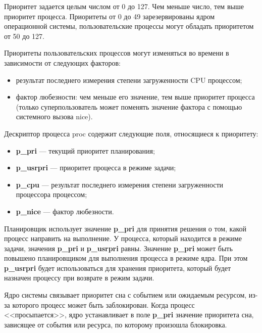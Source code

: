 Приоритет задается целым числом от 0 до 127. Чем меньше число, тем выше приоритет процесса. Приоритеты от 0 до 49 зарезервированы ядром операционной системы, пользовательские процессы могут обладать приоритетом от 50 до 127.

Приоритеты пользовательских процессов могут изменяться во времени в зависимости от следующих факторов:

\begin{itemize}
	\item результат последнего измерения степени загруженности CPU процессом;
	\item фактор любезности: чем меньше его значение, тем выше приоритет процесса (только суперпользователь может поменять значение фактора с помощью системного вызова nice).
\end{itemize}

Дескриптор процесса proc содержит следующие поля, относящиеся к приоритету:

\begin{itemize}
	\item \textbf{p\_pri} --- текущий приоритет планирования;
        \item \textbf{p\_usrpri} --- приоритет процесса в режиме задачи;
        \item \textbf{p\_cpu} --- результат последнего измерения степени загруженности процессора процессом;
	\item \textbf{p\_nice} --- фактор любезности.
\end{itemize}

Планировщик использует значение \textbf{p\_pri} для принятия решения о том, какой процесс направить на выполнение. У процесса, который находится в режиме задачи, значения \textbf{p\_pri} и \textbf{p\_usrpri} равны. Значение  \textbf{p\_pri} может быть повышено планировщиком для выполнения процесса в режиме ядра. При этом \textbf{p\_usrpri} будет использоваться для хранения приоритета, который будет назначен процессу при возврате в режим задачи.

Ядро системы связывает приоритет сна с событием или ожидаемым ресурсом, из-за которого процесс может быть заблокирован. Когда процесс <<просыпается>>, ядро устанавливает в поле \textbf{p\_pri} значение приоритета сна, зависящее от события или ресурса, по которому произошла блокировка.

